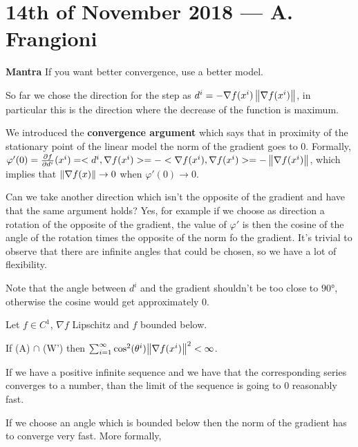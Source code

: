 \documentclass[ComputationalMathematics.tex]{subfiles}
\begin{document}
\section{14th of November 2018 --- A. Frangioni}

\begin{myframe}{{\large {}} \textbf{Mantra}}
If you want better convergence, use a better model.
\end{myframe}

So far we chose the direction for the step as $d^i = - \nabla f(x^i) \left\lVert\nabla f(x^i)\right\rVert$, in particular this is the direction where the decrease of the function is maximum.

We introduced the \textbf{convergence argument} which says that in proximity of the stationary point of the linear model the norm of the gradient goes to $0$. Formally, $\varphi'(0) = \frac{\partial f}{\partial d^i}(x^i) = <d^i, \nabla f(x^i)> = - <\nabla f(x^i), \nabla f(x^i)> = - \left\lVert\nabla f(x^i)\right\rVert$, which implies that $\left\lVert\nabla f(x)\right\rVert \to 0$ when $\varphi'(0) \to 0$.

Can we take another direction which isn't the opposite of the gradient and have that the same argument holds? Yes, for example if we choose as direction a rotation of the opposite of the gradient, the value of $\varphi'$ is then the cosine of the angle of the rotation times the opposite of the norm fo the gradient. It's trivial to observe that there are infinite angles that could be chosen, so we have a lot of flexibility.

Note that the angle between $d^i$ and the gradient shouldn't be too close to $\ang{90}$, otherwise the cosine would get approximately $0$.

\begin{theorem}[Zoutendijk]
  Let $f \in C^1$, $\nabla f$ Lipschitz and $f$ bounded below.
  
  If (A) $\cap$ (W') then $\sum_{i=1}^{\infty} \cos^2(\theta^i) {\left\lVert\nabla f(x^i)\right\rVert}^2 < \infty$.
\end{theorem}

If we have a positive infinite sequence and we have that the corresponding series converges to a number, than the limit of the sequence is going to $0$ reasonably fast.

If we choose an angle which is bounded below then the norm of the gradient has to converge very fast. More formally,
\end{document}
